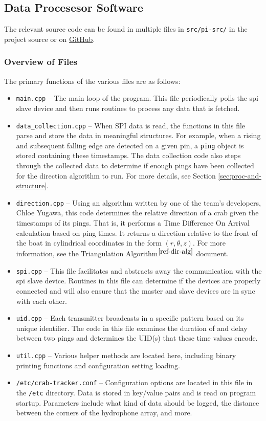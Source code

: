 \documentclass[12pt]{article}
\begin{document}
\subsection{Data Procesesor Software}\label{sec:sw-data-proc}

The relevant source code can be found in multiple files in
\texttt{src/pi-src/} in the project source or on
\href{https://github.com/cabeese/crab-tracker/tree/master/src/pi-src}{GitHub}.

\subsubsection{Overview of Files}

The primary functions of the various files are as follows:
\begin{itemize}
\item \texttt{main.cpp} --
	The main loop of the program. This file periodically polls the
	\gls{spi} slave device and then runs routines to process any data that
	is fetched.
\item \texttt{data\_collection.cpp} --
	When SPI data is read, the functions in this file parse and store the
	data in meaningful structures.
	For example, when a rising and subsequent falling edge are detected on a
	given pin, a \texttt{ping} object is stored containing these timestamps.
	The data collection code also steps through the collected data to determine
	if enough pings have been collected for the direction algorithm to run.
	For more details, see Section \ref{sec:proc-and-structure}.
\item \texttt{direction.cpp} --
	Using an algorithm written by one of the team's developers, Chloe Yugawa,
	this code determines the relative direction of a crab given the timestamps
	of its pings.
	That is, it performs a Time Difference On Arrival calculation
	based on ping times.
	It returns a direction relative to the front of the boat in cylindrical
	coordinates in the form $(r, \theta, z)$.
	For more information, see the
	Triangulation Algorithm$^{\ref{ref-dir-alg}}$ document.
\item \texttt{spi.cpp} --
	This file facilitates and abstracts away the communication with the
	\gls{spi} slave device.
	Routines in this file can determine if the devices are properly connected
	and will also ensure that the master and slave devices are in
	sync with each other.
\item \texttt{uid.cpp} --
	Each transmitter broadcasts in a specific pattern based on its unique
	identifier. The code in this file examines the duration of and delay
	between two pings and determines the UID(s) that these time values
	encode.
\item \texttt{util.cpp} --
	Various helper methods are located here, including binary printing
	functions and configuration setting loading.
\item \texttt{/etc/crab-tracker.conf} --
	Configuration options are located in this file in the \texttt{/etc}
	directory. Data is stored in key/value pairs and is read on program
	startup. Parameters include what kind of data should be logged, the
	distance between the corners of the hydrophone array, and more.
\end{itemize}
\end{document}
